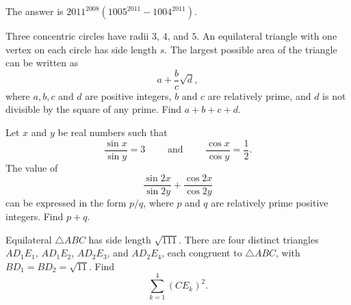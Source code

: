 \documentclass[11pt]{article}
\theoremstyle{definition}
\begin{document}
\begin{solution}
	The answer is $\boxed{2011^{2008}(1005^{2011}-1004^{2011})}$.
\end{solution}






\begin{question}[name={2012 AIME I, \href{https://artofproblemsolving.com/community/c4p2630571}{Problem 13}}]
	Three concentric circles have radii $3$, $4$, and $5$. An equilateral triangle with one vertex on each circle has side length $s$. The largest possible area of the triangle can be written as $$a+\frac{b}{c}\sqrt{d},$$ where $a,b,c$ and $d$ are positive integers, $b$ and $c$ are relatively prime, and $d$ is not divisible by the square of any prime. Find $a+b+c+d$.
\end{question}


%	










\begin{question}[name={2012 AIME II, \href{https://artofproblemsolving.com/community/c4p2644151}{Problem 9}}]
	Let $x$ and $y$ be real numbers such that $$\frac{\sin{x}}{\sin{y}} = 3 \qquad \text{ and } \qquad \frac{\cos{x}}{\cos{y}} = \frac{1}{2}.$$ The value of $$\frac{\sin{2x}}{\sin{2y}} + \frac{\cos{2x}}{\cos{2y}}$$ can be expressed in the form ${p}/{q}$, where $p$ and $q$ are relatively prime positive integers. Find $p + q$.	
\end{question}


%	












\begin{question}[name={2012 AIME II, \href{https://artofproblemsolving.com/community/c4p2644178}{Problem 13}}]
	Equilateral $\triangle ABC$ has side length $\sqrt{111}$. There are four distinct triangles $AD_1E_1$, $AD_1E_2$, $AD_2E_3$, and $AD_2E_4$, each congruent to $\triangle ABC$, with $BD_1 = BD_2=\sqrt{11}$. Find $$\sum^4_{k=1}(CE_k)^2.$$
\end{question}
\end{document}
